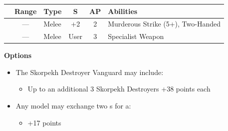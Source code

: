 \begin{minipage}[t]{0.72\textwidth}
	\begin{tabular}{L{90 pt} c C{40pt} *{2}{c} >{\raggedright\arraybackslash}p{130pt}}
		& Range & Type & S & AP & Abilities \\
		\hline
		 & — & Melee & +2 & 2 & Murderous Strike (5+), Two-Handed \\
		 & — & Melee & User & 3 & Specialist Weapon \\
	\end{tabular}
	
	\vspace*{2em}
	\textbf{Options}
	\begin{itemize}
		\item The Skorpekh Destroyer Vanguard may include:
		\begin{itemize}
			\item Up to an additional 3 Skorpekh Destroyers \dotfill +38 points each
		\end{itemize}
		\item Any model may exchange two s for a:
		\begin{itemize}
			\item {} \dotfill +17 points
		\end{itemize}
	\end{itemize}
\end{minipage}
\hspace{0.5em}




\newpage
\subsubsection[Triarch Judicator Vanguard]{}

